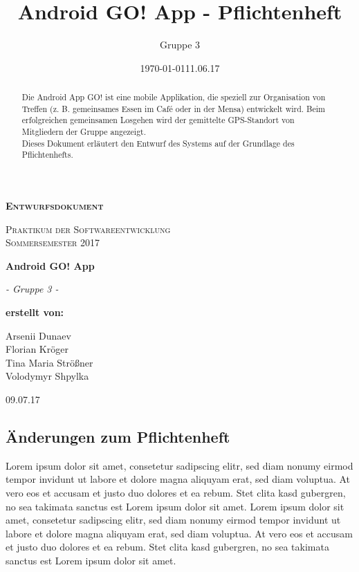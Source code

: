 \documentclass[11pt,a4paper]{report}
\date{\today}
\title{Android GO! App - Pflichtenheft}
\author{Gruppe 3}
\date{11.06.17}
\begin{document}
\begin{titlepage}
	\begin{center}
	{\scshape\LARGE \bfseries Entwurfsdokument \par}
	\vspace{1cm}
	{\scshape\Large Praktikum der Softwareentwicklung \\ Sommersemester 2017\par}
	\vspace{1.5cm}
	{\huge\bfseries Android GO! App\par}
	\vspace{2cm}
	{\Large\itshape - Gruppe 3 -\par}
	\vfill
	{\bfseries erstellt von:\par}
	Arsenii Dunaev \\
	Florian Kröger \\
	Tina Maria Strößner \\
	Volodymyr Shpylka \\	
	\vfill
	{\large 09.07.17 \par}	
	\end{center}
\end{titlepage}

\begin{abstract}
Die Android App GO! ist eine mobile Applikation, die speziell zur Organisation von Treffen (z. B. gemeinsames Essen im Café oder in der Mensa) entwickelt wird. Beim erfolgreichen gemeinsamen Losgehen wird der gemittelte GPS-Standort von Mitgliedern der Gruppe angezeigt.\\

Dieses Dokument erläutert den Entwurf des Systems auf der Grundlage des Pflichtenhefts.
\end{abstract}


\sloppy
{}
\tableofcontents



\subsection{Änderungen zum Pflichtenheft}

Lorem ipsum dolor sit amet, consetetur sadipscing elitr, sed diam nonumy eirmod tempor invidunt ut labore et dolore magna aliquyam erat, sed diam voluptua. At vero eos et accusam et justo duo dolores et ea rebum. Stet clita kasd gubergren, no sea takimata sanctus est Lorem ipsum dolor sit amet. Lorem ipsum dolor sit amet, consetetur sadipscing elitr, sed diam nonumy eirmod tempor invidunt ut labore et dolore magna aliquyam erat, sed diam voluptua. At vero eos et accusam et justo duo dolores et ea rebum. Stet clita kasd gubergren, no sea takimata sanctus est Lorem ipsum dolor sit amet.
\end{document}
